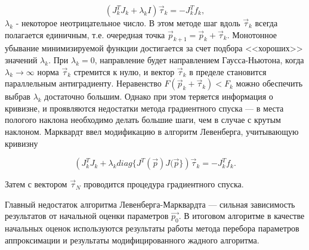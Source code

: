 \begin{equation}
 (J^T_k J_k + \lambda_k I) \vec{\tau}_k = -J^T_k f_k,
\end{equation}
$\lambda_k$ - некоторое неотрицательное число. В этом методе шаг вдоль $\vec{\tau}_k$ всегда 
полагается единичным, т.е. очередная точка $\vec{p}_{k+1} = \vec{p}_k + \vec{\tau}_k$. Монотонное убывание минимизируемой
функции достигается за счет подбора <<хороших>> значений $\lambda_k$. При $\lambda_k = 0$, направление будет 
направлением Гаусса-Ньютона, когда $\lambda_k \to \infty$ норма $\vec{\tau}_k$ стремится к нулю, и вектор
$\vec{\tau}_k$ в пределе становится параллельным антиградиенту. Неравенство $F (\vec{p}_k + \vec{\tau}_k) < F_k$ можно обеспечить
выбрав $\lambda_k$ достаточно большим. Однако при этом теряется информация о кривизне, и проявляются
недостатки метода градиентного спуска --- в места пологого наклона необходимо делать большие шаги, чем в случае
с крутым наклоном. Марквардт ввел модификацию в алгоритм Левенберга, учитывающую кривизну

\begin{equation}
 \left(J^T_k J_k + \lambda_k diag \lbrace J^T(\vec{p}) J(\vec{p} \rbrace \right) \vec{\tau}_k = -J^T_k f_k.
\end{equation}

Затем с вектором $\vec{\tau}_N$ проводится процедура градиентного спуска.

Главный недостаток алгоритма Левенберга-Марквардта --- сильная 
зависимость результатов от начальной оценки параметров $\vec{p_{0}}$. В итоговом алгоритме в 
качестве начальных оценок используются результаты работы метода перебора параметров 
аппроксимации и результаты модифицированного жадного алгоритма.


